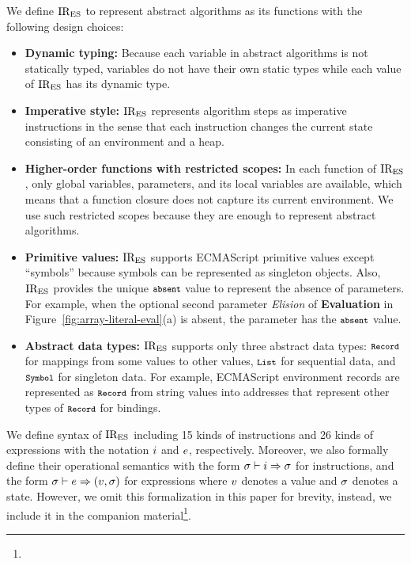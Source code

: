 We define \( \text{IR}_\text{ES} \) to represent abstract algorithms as its
functions with the following design choices:
\begin{itemize}[leftmargin=0.5cm]
\item \textbf{Dynamic typing:} Because each variable in abstract
algorithms is not statically typed, variables do not have their own
static types while each value of \( \text{IR}_\text{ES} \) has its dynamic type.

\item \textbf{Imperative style:} \( \text{IR}_\text{ES} \) represents algorithm steps
as imperative instructions in the sense that each instruction changes
the current state consisting of an environment and a heap.

\item \textbf{Higher-order functions with restricted scopes:}
In each function of \( \text{IR}_\text{ES} \), only global variables, parameters,
and its local variables are available, which means that a function
closure does not capture its current environment.  We use such
restricted scopes because they are enough to represent abstract
algorithms.

\item \textbf{Primitive values:} \( \text{IR}_\text{ES} \) supports ECMAScript primitive
values except ``symbols'' because symbols can be represented as singleton
objects.  Also, \( \text{IR}_\text{ES} \) provides the unique \( \texttt{\footnotesize absent} \) value to
represent the absence of parameters.  For example, when the optional second
parameter \textit{Elision} of \textbf{Evaluation} in
Figure~\ref{fig:array-literal-eval}(a) is absent, the parameter has the \(
\texttt{\footnotesize absent} \) value.

\item \textbf{Abstract data types:} \( \text{IR}_\text{ES} \) supports only three abstract
data types: \( \texttt{\footnotesize Record} \) for mappings from some values to other values,
\( \texttt{\footnotesize List} \) for sequential data, and \( \texttt{\footnotesize Symbol} \) for singleton
data.  For example, ECMAScript environment records are represented as \(
\texttt{\footnotesize Record} \) from string values into addresses that represent other types
of \( \texttt{\footnotesize Record} \) for bindings.
\end{itemize}
We define syntax of \( \text{IR}_\text{ES} \) including 15 kinds of instructions and 26 kinds
of expressions with the notation \( i \) and \( e \), respectively.
Moreover, we also formally define their operational semantics with the form \(
\sigma \vdash i \Rightarrow \sigma \) for instructions, and the form
\( \sigma \vdash e \Rightarrow (v, \sigma) \) for expressions
where \( v \) denotes a value and \( \sigma \) denotes a state.
However, we omit this formalization in this paper for brevity, instead, we
include it in the companion material\footnote{}.


